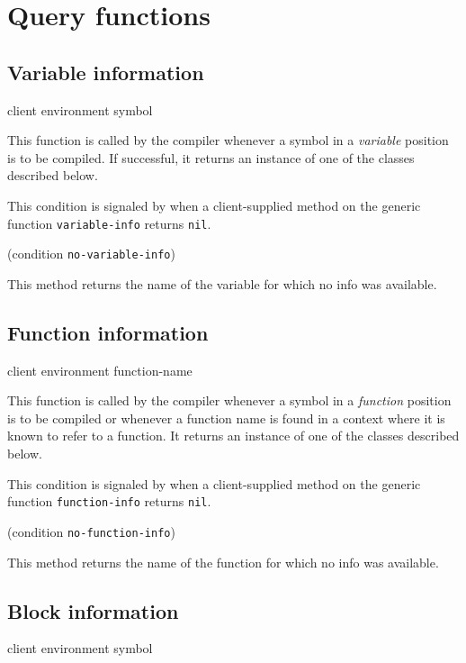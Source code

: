 \section{Query functions}

\subsection{Variable information}

 {client environment symbol}

This function is called by the compiler whenever a symbol in a
\emph{variable} position is to be compiled.  If successful, it returns an instance of
one of the classes described below.


This condition is signaled by \sysname{} when a client-supplied method
on the generic function \texttt{variable-info} returns \texttt{nil}.

 {(condition {\tt no-variable-info})}

This method returns the name of the variable for which no info was
available.

\subsection{Function information}

 {client environment function-name}

This function is called by the compiler whenever a symbol in a
\emph{function} position is to be compiled or whenever a function name
is found in a context where it is known to refer to a function.  It
returns an instance of one of the classes described below.


This condition is signaled by \sysname{} when a client-supplied method
on the generic function \texttt{function-info} returns \texttt{nil}.

 {(condition {\tt no-function-info})}

This method returns the name of the function for which no info was
available.

\subsection{Block information}

 {client environment symbol}

